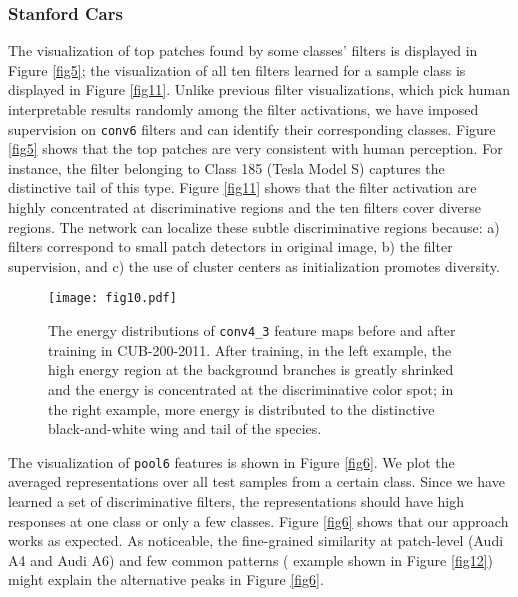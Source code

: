 \documentclass[10pt,twocolumn,letterpaper]{article}
\begin{document}
\subsubsection{Stanford Cars} \label{sec4_4_2}
The visualization of top patches found by some classes'  filters is displayed in Figure \ref{fig5}; the
visualization of all ten filters learned for a sample class is displayed in Figure \ref{fig11}. Unlike
previous filter visualizations, which pick human interpretable results randomly among the filter activations, we have
imposed supervision on \texttt{conv6} filters and can identify their corresponding classes. Figure
\ref{fig5} shows that the top patches are very consistent with human perception.
For instance, the  filter belonging to
Class 185 (Tesla Model S) captures the distinctive tail of this type. Figure \ref{fig11} shows that the filter
activation are highly concentrated at discriminative regions and the ten filters cover diverse regions.
The network can localize these subtle discriminative regions because:
a)  filters correspond to small patch detectors in original image, b) the filter supervision, and c) the
use of cluster centers as initialization promotes diversity.
\begin{figure}
\begin{center}
\texttt{[image: fig10.pdf]}
\end{center}
   \vspace{-10pt}
   \caption{\label{fig10}The energy distributions of \texttt{conv4\_3} feature maps before and after training in
   CUB-200-2011. After training, in the left example, the high energy region at the background branches is greatly
   shrinked and the energy is concentrated at the discriminative color spot; in the right example, more energy is distributed to the
   distinctive black-and-white wing and tail of the species.}
   \vspace{-10pt}
\end{figure}

The visualization of \texttt{pool6} features is shown in Figure \ref{fig6}. We plot the averaged representations over all
test samples from a certain class. Since we have learned a set of discriminative filters, the representations
should have high responses at one class or only a few classes. Figure \ref{fig6} shows that our approach works as
expected. As noticeable, the fine-grained similarity at patch-level (\eg Audi A4 and Audi A6) and few common patterns (
example shown in Figure \ref{fig12}) might explain the alternative peaks in Figure \ref{fig6}.
\end{document}
